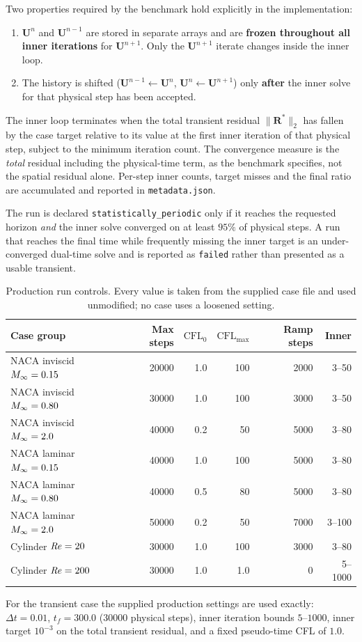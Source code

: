 Two properties required by the benchmark hold explicitly in the implementation:

\begin{enumerate}
  \item $\mathbf{U}^{n}$ and $\mathbf{U}^{n-1}$ are stored in separate arrays and
  are \textbf{frozen throughout all inner iterations} for $\mathbf{U}^{n+1}$.
  Only the $\mathbf{U}^{n+1}$ iterate changes inside the inner loop.
  \item The history is shifted ($\mathbf{U}^{n-1}\!\leftarrow\!\mathbf{U}^{n}$,
  $\mathbf{U}^{n}\!\leftarrow\!\mathbf{U}^{n+1}$) only \textbf{after} the inner
  solve for that physical step has been accepted.
\end{enumerate}

The inner loop terminates when the total transient residual $\|\mathbf{R}^\ast\|_2$
has fallen by the case target relative to its value at the first inner iteration
of that physical step, subject to the minimum iteration count. The convergence
measure is the \emph{total} residual including the physical-time term, as the
benchmark specifies, not the spatial residual alone. Per-step inner counts, target
misses and the final ratio are accumulated and reported in
\texttt{metadata.json}.

The run is declared \texttt{statistically\_periodic} only if it reaches the
requested horizon \emph{and} the inner solve converged on at least $95\%$ of
physical steps. A run that reaches the final time while frequently missing the
inner target is an under-converged dual-time solve and is reported as
\texttt{failed} rather than presented as a usable transient.

\begin{table}[htbp]
  \centering
  \caption{Production run controls. Every value is taken from the supplied case
  file and used unmodified; no case uses a loosened setting.}
  \label{tab:controls}
  \small
  \begin{tabular}{lrrrrr}
    \toprule
    Case group & Max steps & $\mathrm{CFL}_0$ & $\mathrm{CFL}_{\max}$
      & Ramp steps & Inner \\
    \midrule
    NACA inviscid $M_\infty=0.15$ & \num{20000} & 1.0 & 100 & \num{2000} & 3--50 \\
    NACA inviscid $M_\infty=0.80$ & \num{30000} & 1.0 & 100 & \num{3000} & 3--50 \\
    NACA inviscid $M_\infty=2.0$ & \num{40000} & 0.2 & 50 & \num{5000} & 3--80 \\
    NACA laminar $M_\infty=0.15$ & \num{40000} & 1.0 & 100 & \num{5000} & 3--80 \\
    NACA laminar $M_\infty=0.80$ & \num{40000} & 0.5 & 80 & \num{5000} & 3--80 \\
    NACA laminar $M_\infty=2.0$ & \num{50000} & 0.2 & 50 & \num{7000} & 3--100 \\
    Cylinder $\mathit{Re}=20$ & \num{30000} & 1.0 & 100 & \num{3000} & 3--80 \\
    Cylinder $\mathit{Re}=200$ & \num{30000} & 1.0 & 1.0 & 0 & 5--1000 \\
    \bottomrule
  \end{tabular}
\end{table}

For the transient case the supplied production settings are used exactly:
$\Delta t=0.01$, $t_f=300.0$ ($\num{30000}$ physical steps), inner iteration
bounds $5$--$1000$, inner target $10^{-3}$ on the total transient residual, and a
fixed pseudo-time CFL of $1.0$.
